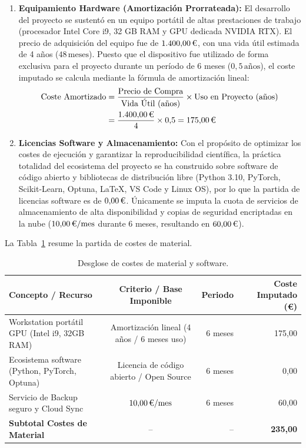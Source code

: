 \begin{enumerate}
    \item \textbf{Equipamiento Hardware (Amortización Prorrateada):} El desarrollo del proyecto se sustentó en un equipo portátil de altas prestaciones de trabajo (procesador Intel Core i9, 32 GB RAM y GPU dedicada NVIDIA RTX). El precio de adquisición del equipo fue de $1.400{,}00\,\text{\euro}$, con una vida útil estimada de 4 años ($48\,\text{meses}$). Puesto que el dispositivo fue utilizado de forma exclusiva para el proyecto durante un período de 6 meses ($0{,}5\,\text{años}$), el coste imputado se calcula mediante la fórmula de amortización lineal:
    \begin{equation}
    \label{eq:coste_amortizado}
    \begin{split}
        \text{Coste Amortizado} &= \frac{\text{Precio de Compra}}{\text{Vida Útil (años)}} \times \text{Uso en Proyecto (años)} \\
        &= \frac{1.400{,}00\,\text{\euro}}{4} \times 0{,}5 = 175{,}00\,\text{\euro}
    \end{split}
    \end{equation}
    
    \item \textbf{Licencias Software y Almacenamiento:} Con el propósito de optimizar los costes de ejecución y garantizar la reproducibilidad científica, la práctica totalidad del ecosistema del proyecto se ha construido sobre software de código abierto y bibliotecas de distribución libre (Python 3.10, PyTorch, Scikit-Learn, Optuna, LaTeX, VS Code y Linux OS), por lo que la partida de licencias software es de $0{,}00\,\text{\euro}$. Únicamente se imputa la cuota de servicios de almacenamiento de alta disponibilidad y copias de seguridad encriptadas en la nube ($10{,}00\,\text{\euro}/\text{mes}$ durante 6 meses, resultando en $60{,}00\,\text{\euro}$).
\end{enumerate}

La Tabla~\ref{tab:costes_material} resume la partida de costes de material.

\begin{table}[htbp]
\centering
\caption{Desglose de costes de material y software.}
\label{tab:costes_material}
\small
\begin{tabularx}{\linewidth}{@{}Xcrr@{}}
\toprule
\textbf{Concepto / Recurso} & \textbf{Criterio / Base Imponible} & \textbf{Periodo} & \textbf{Coste Imputado (\euro)} \\
\midrule
Workstation portátil GPU (Intel i9, 32GB RAM) & Amortización lineal (4 años / 6 meses uso) & 6 meses & 175,00 \\
Ecosistema software (Python, PyTorch, Optuna) & Licencia de código abierto / Open Source & 6 meses & 0,00 \\
Servicio de Backup seguro y Cloud Sync & $10{,}00\,\text{\euro}/\text{mes}$ & 6 meses & 60,00 \\
\midrule
\textbf{Subtotal Costes de Material} & -- & -- & \textbf{235,00} \\
\bottomrule
\end{tabularx}
\end{table}


